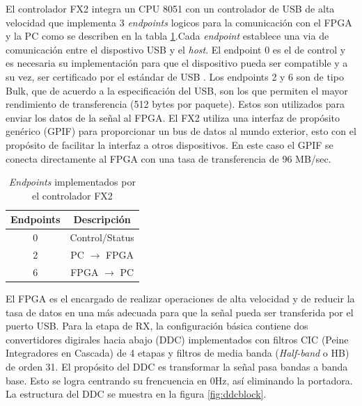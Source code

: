 El controlador FX2 integra un CPU 8051 con un controlador de USB de alta velocidad que implementa 3
\emph{endpoints} logicos para la comunicaci\'on con el FPGA y la PC como se describen en la tabla
\ref{tbl:endpoints}.Cada \emph{endpoint} establece una via de comunicaci\'on entre el dispostivo
USB y el \emph{host}. El endpoint 0 es el de control y es necesaria su implementaci\'on para que el
dispositivo pueda ser compatible y a su vez, ser certificado por el est\'andar de USB \cite{usb}.
Los endpoints 2 y 6 son de tipo Bulk, que de acuerdo a la especificaci\'on del USB, son los que
permiten el mayor rendimiento de transferencia (512 bytes por paquete). Estos son utilizados para
enviar los datos de la se\~nal al FPGA. El FX2 utiliza una interfaz de prop\'osito gen\'erico (GPIF)
para proporcionar un bus de datos al mundo exterior, esto con el prop\'osito de facilitar la
interfaz a otros dispositivos. En este caso el GPIF se conecta directamente al FPGA con una tasa de
transferencia de 96 MB/sec.

\begin{table}[htp]
\begin{center}
	\begin{tabular}{|c|c|}
		\hline
		\textbf{Endpoints} & \textbf{Descripci\'on} \\
		\hline
		0 & Control/Status \\
		\hline
		2 & PC $\rightarrow$ FPGA \\
		\hline
		6 & FPGA $\rightarrow$ PC \\
		\hline
	\end{tabular}\label{tbl:endpoints}
	\vspace{0.5in}
	\caption{\emph{Endpoints} implementados por el controlador FX2}
\end{center}
\end{table}

El FPGA es el encargado de realizar operaciones de alta velocidad y de reducir
la tasa de datos en una m\'as adecuada para que la se\~nal pueda ser transferida
por el puerto USB. Para la etapa de RX, la configuraci\'on b\'asica contiene dos
convertidores digirales hacia abajo (DDC) implementados con filtros CIC (Peine
Integradores en Cascada) de 4 etapas y filtros de media banda (\emph{Half-band}
o HB) de orden 31. El prop\'osito del DDC es transformar la se\~nal pasa bandas a banda base. Esto
se logra centrando su frencuencia en 0Hz, as\'i eliminando la portadora. La estructura del
DDC se muestra en la figura \ref{fig:ddcblock}.

